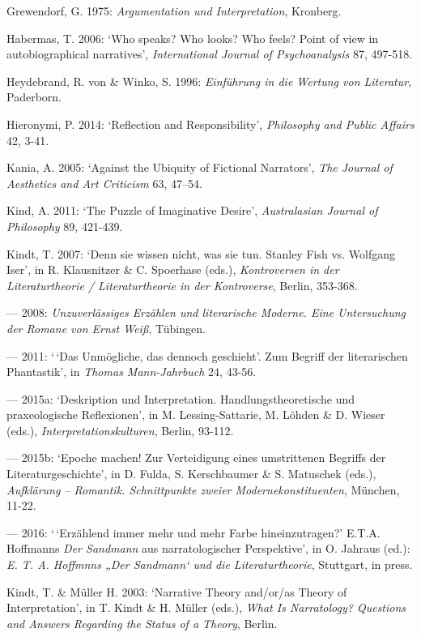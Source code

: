 \begin{hangparas}{.5cm}{1}
Grewendorf, G. 1975: \emph{Argumentation und Interpretation}, Kronberg.

Habermas, T. 2006: `Who speaks? Who looks? Who feels? Point of view in autobiographical narratives', \emph{International Journal of Psychoanalysis} 87, 497-518. 

Heydebrand, R. von \& Winko, S. 1996: \emph{Einf\"uhrung in die Wertung von Literatur}, Paderborn.

Hieronymi, P. 2014: `Reflection and Responsibility', \emph{Philosophy and Public Affairs} 42, 3-41.

Kania, A. 2005: `Against the Ubiquity of Fictional Narrators', \emph{The Journal of Aesthetics and Art Criticism} 63, 47--54.

Kind, A. 2011: `The Puzzle of Imaginative Desire', \emph{Australasian Journal of Philosophy} 89, 421-439.

Kindt, T. 2007: `Denn sie wissen nicht, was sie tun. Stanley Fish vs. Wolfgang Iser', in R. Klausnitzer \& C. Spoerhase (eds.), \emph{Kontroversen in der Literaturtheorie / Literaturtheorie in der Kontroverse}, Berlin, 353-368.

--- 2008: \emph{Unzuverl\"assiges Erz\"ahlen und literarische Moderne. Eine Untersuchung der Romane von Ernst Wei{\ss}}, T\"ubingen. 

--- 2011: `\,`Das Unm\"ogliche, das dennoch geschieht'. Zum Begriff der literarischen Phantastik', in \emph{Thomas Mann-Jahrbuch} 24, 43-56.

--- 2015a: `Deskription und Interpretation. Handlungstheoretische und praxeologische Reflexionen', in M. Lessing-Sattarie, M. L\"ohden \& D. Wieser (eds.), \emph{Interpretationskulturen}, Berlin, 93-112.

--- 2015b: `Epoche machen! Zur Verteidigung eines umstrittenen Begriffs der Literaturgeschichte', in D. Fulda, S. Kerschbaumer \& S. Matuschek (eds.), \emph{Aufkl\"arung -- Romantik. Schnittpunkte zweier Modernekonstituenten}, M\"unchen, 11-22.

--- 2016: `\,`Erz\"ahlend immer mehr und mehr Farbe hineinzutragen?' E.T.A. Hoffmanns \emph{Der Sandmann} aus narratologischer Perspektive', in O. Jahraus (ed.): \emph{E. T. A. Hoffmnns „Der Sandmann` und die Literaturtheorie}, Stuttgart, in press.

Kindt, T. \& M\"uller H. 2003: `Narrative Theory and/or/as Theory of Interpretation', in T. Kindt \& H. M\"uller (eds.), \emph{What Is Narratology? Questions and Answers Regarding the Status of a Theory}, Berlin.


\end{hangparas}
